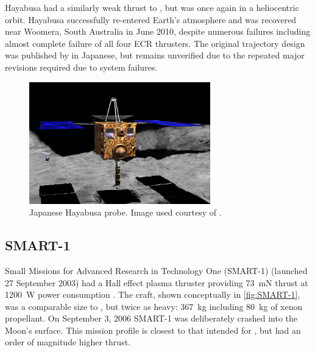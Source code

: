 Hayabusa had a similarly weak thrust to \BW, but was once again in a heliocentric orbit. Hayabusa successfully re-entered Earth's atmosphere and was recovered near Woomera, South Australia in June 2010, despite numerous failures including almost complete failure of all four ECR thrusters. The original trajectory design was published by \textcite{Masatoshi2003} in Japanese, but remains unverified due to the repeated major revisions required due to system failures.


\begin{figure}[ht]
\centering
\includegraphics [width=0.7\textwidth] {Images/800px-Hayabusa_hover.jpg}
\caption{Japanese Hayabusa probe. Image used courtesy of \textcite{web_Hayabusa_NASA}.}
\label{fig:Hayabusa}
\end{figure}

\subsection{SMART-1}
Small Missions for Advanced Research in Technology One (SMART-1) (launched 27 September 2003) had a Hall effect plasma thruster providing 73~mN thrust at 1200~W power consumption \parencite{web_SMART-1}. The craft, shown conceptually in \autoref{fig:SMART-1}, was a comparable size to \BW, but twice as heavy: 367~kg including 80~kg of xenon propellant. On September 3, 2006 SMART-1 was deliberately crashed into the Moon's surface. This mission profile is closest to that intended for \BW, but had an order of magnitude higher thrust. 

